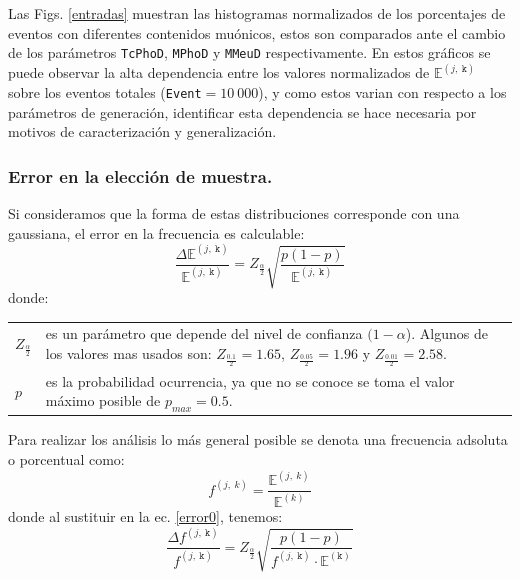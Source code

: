 Las Figs. \ref{entradas} %
muestran las histogramas normalizados de los porcentajes de eventos con diferentes contenidos muónicos, estos son comparados ante el cambio de los parámetros \texttt{TcPhoD}, \texttt{MPhoD} y \texttt{MMeuD} respectivamente. En estos gráficos se puede observar la alta dependencia entre los valores normalizados de $\mathbb{E}^{(j,~\mathtt{k})}$ sobre los eventos totales (\texttt{Event}$= 10~000$), y como estos varian con respecto a los parámetros de generación, identificar esta dependencia se hace necesaria por motivos de caracterización y generalización.

\subsubsection{Error en la elección de muestra.}
Si consideramos que la forma de estas distribuciones corresponde con una gaussiana, el error en la frecuencia es calculable:
\begin{equation}\label{error0}
\dfrac{\Delta \mathbb{E}^{(j,~\mathtt{k})}}{\mathbb{E}^{(j,~\mathtt{k})}} = Z_{\frac{\alpha}{2}} \sqrt{\dfrac{p(1-p)}{\mathbb{E}^{(j,~\mathtt{k})}}} 
\end{equation}%
donde:\\
\begin{tabular}{lp{14cm}}
$Z_{\frac{\alpha}{2}}$ & es un parámetro que depende del nivel de confianza $(1-\alpha$). Algunos de los valores mas usados son: $Z_{\frac{0.1}{2}}=1.65$, $Z_{\frac{0.05}{2}}=1.96$ y $Z_{\frac{0.01}{2}}=2.58$.\\
$p$ & es la probabilidad ocurrencia, ya que no se conoce se toma el valor máximo posible de $p_{max}=0.5$.
\end{tabular}

Para realizar los análisis lo más general posible se denota una frecuencia adsoluta o porcentual como:
\begin{equation}
f^{(j,~k)} = \dfrac{\mathbb{E}^{(j,~k)}}{\mathbb{E}^{(k)}}
\end{equation}
donde al sustituir en la ec. \ref{error0}, tenemos:
\begin{equation}
\dfrac{\Delta f^{(j,~\mathtt{k})}}{f^{(j,~\mathtt{k})}} = Z_{\frac{\alpha}{2}} \sqrt{\dfrac{p(1-p)}{f^{(j,~\mathtt{k})} \cdot \mathbb{E}^{(\mathtt{k})}}} 
\end{equation}
